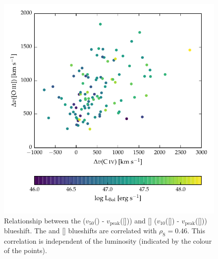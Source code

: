 \begin{figure}[t!]
    \centering
    \includegraphics[width=\linewidth]{figures/chapter04/civ_blueshift_oiii_blueshift.pdf} 
    \caption[{Relationship between the  and [] blueshifts.}]{Relationship between the  ($v_{50}$() - $v_{\text{peak}}$([])) and [] ($v_{10}$([]) - $v_{\text{peak}}$([])) blueshift. The  and [] blueshifts are correlated with $\rho_{\text{S}}=0.46$. This correlation is independent of the luminosity (indicated by the colour of the points). }
    \label{fig:oiii_civ_blueshifts}
\end{figure}

